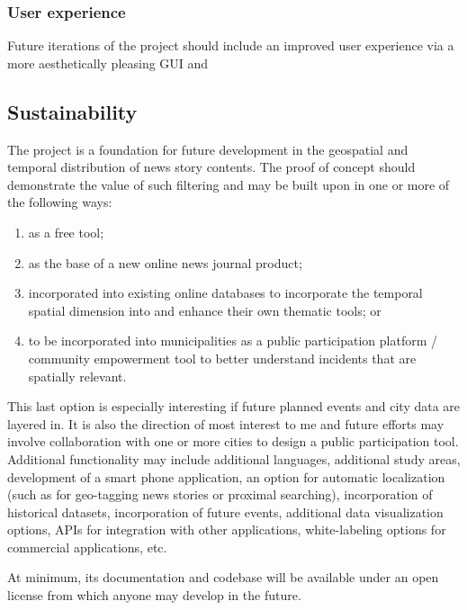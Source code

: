\subsubsection{User experience}
Future iterations of the project should include an improved  user experience via a more aesthetically pleasing GUI and 

\subsection{Sustainability}
The project is a foundation for future development in the geospatial and temporal distribution of news story contents.  The proof of concept should demonstrate the value of such filtering and may be built upon in one or more of the following ways: 
\begin{enumerate}
	\item as a free tool; 
	\item as the base of a new online news journal product;
	\item incorporated into existing online databases to incorporate the temporal spatial dimension into and enhance their own thematic tools; or 
	\item to be incorporated into municipalities as a public participation platform / community empowerment tool to better understand incidents that are spatially relevant. 
\end{enumerate}

This last option is especially interesting if future planned events and city data are layered in. It is also the direction of most interest to me and future efforts may involve collaboration with one or more cities to design a public participation tool. Additional functionality may include additional languages, additional study areas, development of a smart phone application, an option for automatic localization (such as for geo-tagging news stories or proximal searching), incorporation of historical datasets, incorporation of future events, additional data visualization options, APIs for integration with other applications, white-labeling options for commercial applications, etc.

At minimum, its documentation and codebase will be available under an open license from which anyone may develop in the future.
